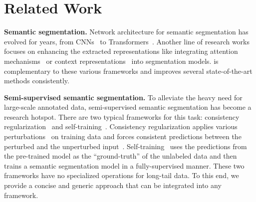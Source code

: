 \section{Related Work}\label{sec:related-work}


\noindent\textbf{Semantic segmentation.}
%
%
Network architecture for semantic segmentation has evolved for years, from CNNs~\cite{fcn, pspnet, deeplab} to Transformers~\cite{zhang2021k, zheng2021rethinking, xie2021segformer, chen2022vision, dosovitskiy2020image}.
%
%
%
Another line of research works focuses on enhancing the extracted representations like integrating attention mechanisms~\cite{fu2019dual, huang2019ccnet, li2018pyramid, zhong2020squeeze} or context representations~\cite{yuan2020object, wang2020deep, zhang2018context, lin2018multi, yu2020context, yuan2021ocnet} into segmentation models.
%
\method is complementary to these various frameworks and improves several state-of-the-art methods consistently.


\noindent\textbf{Semi-supervised semantic segmentation.}
%
To alleviate the heavy need for large-scale annotated data, semi-supervised semantic segmentation has become a research hotspot.
%
There are two typical frameworks for this task: consistency regularization~\cite{em, chen2021semisupervised, french2019semi} and self-training~\cite{fixmatch, dash, cct, bachman2014learning}.
%
Consistency regularization applies various perturbations~\cite{french2019semi} on training data and forces consistent predictions between the perturbed and the unperturbed input~\cite{em}.
%
Self-training~\cite{zuo2021self, st++, wang2022semi, xie2020self, cct, cutmix, ael} uses the predictions from the pre-trained model as the ``ground-truth'' of the unlabeled data and then trains a semantic segmentation model in a fully-supervised manner.
%
These two frameworks have no specialized operations for long-tail data.
%
To this end, we provide a concise and generic approach that can be integrated into any framework.


